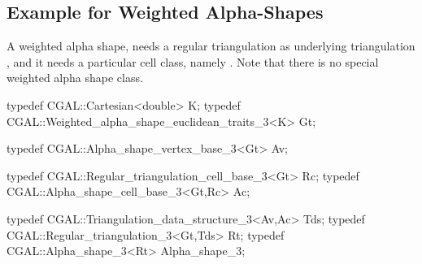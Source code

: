 
\subsection{Example for Weighted Alpha-Shapes\label{I1_SectWeightedAS3D}}

A weighted alpha shape, needs a regular triangulation as
underlying triangulation , and it needs a particular
cell class, namely .
Note that there is no special weighted alpha shape class.

\begin{cprog}
typedef CGAL::Cartesian<double> K;
typedef CGAL::Weighted_alpha_shape_euclidean_traits_3<K> Gt;

typedef CGAL::Alpha_shape_vertex_base_3<Gt> Av;

typedef CGAL::Regular_triangulation_cell_base_3<Gt> Rc;
typedef CGAL::Alpha_shape_cell_base_3<Gt,Rc>  Ac;

typedef CGAL::Triangulation_data_structure_3<Av,Ac> Tds;
typedef CGAL::Regular_triangulation_3<Gt,Tds> Rt;
typedef CGAL::Alpha_shape_3<Rt> Alpha_shape_3;
\end{cprog}
